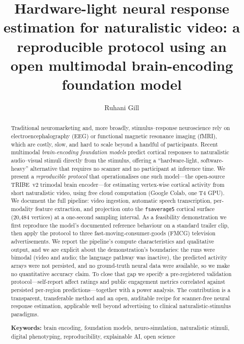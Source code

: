 \documentclass[11pt]{article}
\title{\vspace{-2em}\bfseries Hardware-light neural response estimation for
naturalistic video: a reproducible protocol using an open multimodal
brain-encoding foundation model}
\author[1,*]{Ruhani Gill}
\affil[1]{Amity University, Noida, Uttar Pradesh, India}
\affil[ ]{Work conducted under the guidance of Dr Misha Kakkar, Amity University, Noida.}
\affil[*]{Correspondence: \texttt{[insert Ruhani Gill's email]}}
\date{}
\begin{document}
\maketitle

\begin{abstract}
\noindent
Traditional neuromarketing and, more broadly, stimulus--response neuroscience
rely on electroencephalography (EEG) or functional magnetic resonance imaging
(fMRI), which are costly, slow, and hard to scale beyond a handful of
participants. Recent multimodal \emph{brain-encoding foundation models} predict
cortical responses to naturalistic audio--visual stimuli directly from the
stimulus, offering a ``hardware-light, software-heavy'' alternative that
requires no scanner and no participant at inference time. We present a
\emph{reproducible protocol} that operationalises one such model---the
open-source TRIBE~v2 trimodal brain encoder---for estimating vertex-wise
cortical activity from short naturalistic video, using free cloud computation
(Google Colab, one T4 GPU). We document the full pipeline: video ingestion,
automatic speech transcription, per-modality feature extraction, and
projection onto the \texttt{fsaverage5} cortical surface (20{,}484 vertices) at
a one-second sampling interval. As a feasibility demonstration we first
reproduce the model's documented reference behaviour on a standard trailer
clip, then apply the protocol to three fast-moving-consumer-goods (FMCG)
television advertisements. We report the pipeline's compute characteristics and
qualitative output, and we are explicit about the demonstration's boundaries:
the runs were bimodal (video and audio; the language pathway was inactive), the
predicted activity arrays were not persisted, and no ground-truth neural data
were available, so we make no quantitative accuracy claim. To close that gap we
specify a pre-registered validation protocol---self-report affect ratings and
public engagement metrics correlated against persisted per-region
predictions---together with a power analysis. The contribution is a
transparent, transferable method and an open, auditable recipe for
scanner-free neural response estimation, applicable well beyond advertising to
clinical naturalistic-stimulus paradigms.

\vspace{0.6em}
\noindent\textbf{Keywords:} brain encoding, foundation models, neuro-simulation,
naturalistic stimuli, digital phenotyping, reproducibility, explainable AI,
open science
\end{abstract}
\end{document}
